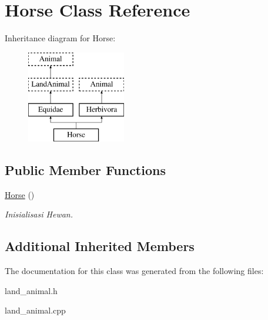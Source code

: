 \hypertarget{class_horse}{}\section{Horse Class Reference}
\label{class_horse}
Inheritance diagram for Horse\+:\begin{figure}[H]
\begin{center}
\leavevmode
\includegraphics[height=4.000000cm]{class_horse}
\end{center}
\end{figure}
\subsection*{Public Member Functions}
\begin{DoxyCompactItemize}
\item 
\hyperlink{class_horse_a3eb8fdcab562c6a19da3fcdce2c82ea1}{Horse} ()\hypertarget{class_horse_a3eb8fdcab562c6a19da3fcdce2c82ea1}{}\label{class_horse_a3eb8fdcab562c6a19da3fcdce2c82ea1}

\begin{DoxyCompactList}\small\item\em Inisialisasi Hewan. \end{DoxyCompactList}\end{DoxyCompactItemize}
\subsection*{Additional Inherited Members}


The documentation for this class was generated from the following files\+:\begin{DoxyCompactItemize}
\item 
land\+\_\+animal.\+h\item 
land\+\_\+animal.\+cpp\end{DoxyCompactItemize}
